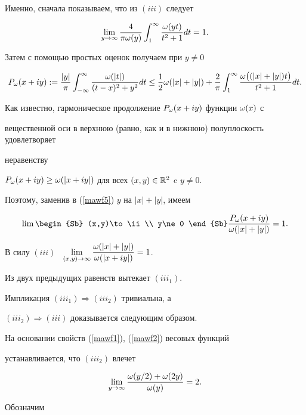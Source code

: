 Именно, сначала показываем, что из $(iii)$ следует


\begin{equation}\label{mawf5}


\lim_{y\to \ii}\frac{4}{\pi\o(y)}\int_{1}^{\ii}\frac{\o(yt)}{t^2+1}dt=1.


\end{equation}


Затем с помощью простых оценок получаем при $y\ne 0$


$$


P_{\o}(x+iy):=\frac{|y|}{\pi}\int_{-\ii}^{\ii}\frac{\o(|t|)}{(t-x)^2+y^2}dt


\le\frac{1}{2}\o(|x|+|y|)+\frac{2}{\pi}


\int_{1}^{\ii}\frac{\o\big((|x|+|y|)t\big)}{t^2+1}dt.


$$


Как известно, гармоническое продолжение $P_{\omega}(x+iy)$ функции $\omega(x)$ с 


вещественной оси в верхнюю (равно, как и в нижнюю) полуплоскость удовлетворяет 


неравенству 


$P_{\omega}(x+iy)\ge \omega(|x+iy|)$ для всех $(x,y)\in\Bbb R^2$ c $y\ne 0$.


Поэтому, заменив в (\ref{mawf5}) $y$ на $|x|+|y|$, имеем 


$$


\lim\begin{Sb} (x,y)\to \ii \\ y\ne 0 \end{Sb}


\frac{P_{\o}(x+iy)}{\o(|x|+|y|)}=1.


$$


В силу $(iii)$ \ $\lim\limits_{(x,y)\to \ii}


\dfrac{\o(|x|+|y|)}{\o(|x+iy|)}=1$.


Из двух предыдущих равенств вытекает $(iii_1)$. 


Импликация $(iii_1)\Rightarrow (iii_2)$ тривиальна, а 


$(iii_2)\Rightarrow (iii)$ доказывается следующим образом.


На основании свойств (\ref{mawf1}), (\ref{mawf2}) весовых функций 


устанавливается, что $(iii_2)$ влечет


$$


\lim_{y\to \ii}\frac{\o(y/2)+\o(2y)}{\o(y)}=2.


$$


Обозначим 


